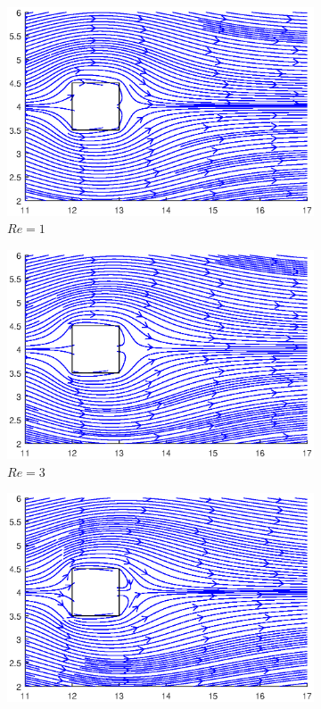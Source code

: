 \pagebreak
\begin{figure}[H]
	\centering
	\begin{subfigure}{0.5\textwidth}
		\includegraphics[scale=0.6]{Square/1}
		\caption{$Re=1$}
	\end{subfigure}%
	\begin{subfigure}{0.5\textwidth}
		\includegraphics[scale=0.6]{Square/3}
		\caption{$Re=3$}
	\end{subfigure}
	\begin{subfigure}{0.5\textwidth}
		\includegraphics[scale=0.6]{Square/5}

\end{subfigure}
\end{figure}
